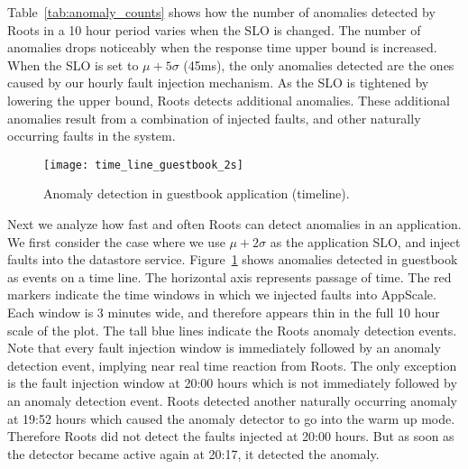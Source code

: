 Table~\ref{tab:anomaly_counts} shows how the number of anomalies detected by 
Roots in a 10 hour period varies when the SLO is changed. The number of anomalies
drops noticeably when the response time upper bound is increased. When the
SLO is set to $\mu + 5\sigma$ (45ms), the only anomalies detected are the ones
caused by our hourly fault injection mechanism. As the SLO is tightened by lowering the upper bound,
Roots detects additional anomalies. These additional anomalies
result from a combination of injected faults, and other naturally occurring faults
in the system.

\begin{figure}
\centering
\texttt{[image: time\_line\_guestbook\_2s]}
\caption{Anomaly detection in guestbook application (timeline).}
\label{fig:time_line_guestbook_2s}
\end{figure}

Next we analyze how fast and often Roots can detect anomalies in an application. We
first consider the case where we use $\mu + 2\sigma$ as the application SLO, and 
inject faults into the datastore service. Figure~\ref{fig:time_line_guestbook_2s} shows
anomalies detected in guestbook as events on a time line. The horizontal axis represents 
passage of time. The red markers indicate the time windows in which we injected faults into
AppScale. Each window is 3 minutes wide, and therefore appears thin in the full 10 hour scale
of the plot. The tall blue lines indicate the Roots anomaly detection events.
Note that every fault injection window is immediately followed by an anomaly
detection event, implying near real time reaction from Roots. The only exception is the fault
injection window at 20:00 hours which is not immediately followed by an anomaly 
detection event. Roots detected another naturally occurring anomaly at 19:52 hours
which caused the anomaly detector to go into the warm up mode. Therefore Roots
did not detect the faults injected at 20:00 hours. But as soon as the detector became
active again at 20:17, it detected the anomaly.